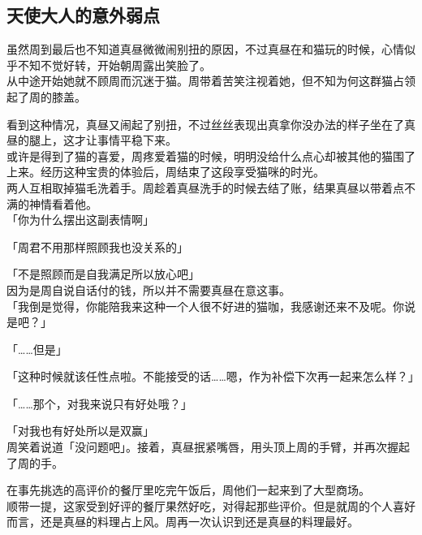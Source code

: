 \subsection{天使大人的意外弱点}

虽然周到最后也不知道真昼微微闹别扭的原因，不过真昼在和猫玩的时候，心情似乎不知不觉好转，开始朝周露出笑脸了。\\

从中途开始她就不顾周而沉迷于猫。周带着苦笑注视着她，但不知为何这群猫占领起了周的膝盖。

看到这种情况，真昼又闹起了别扭，不过丝丝表现出真拿你没办法的样子坐在了真昼的腿上，这才让事情平稳下来。\\

或许是得到了猫的喜爱，周疼爱着猫的时候，明明没给什么点心却被其他的猫围了上来。经历这种宝贵的体验后，周结束了这段享受猫咪的时光。\\

两人互相取掉猫毛洗着手。周趁着真昼洗手的时候去结了账，结果真昼以带着点不满的神情看着他。\\

「你为什么摆出这副表情啊」

「周君不用那样照顾我也没关系的」

「不是照顾而是自我满足所以放心吧」\\

因为是周自说自话付的钱，所以并不需要真昼在意这事。\\

「我倒是觉得，你能陪我来这种一个人很不好进的猫咖，我感谢还来不及呢。你说是吧？」

「……但是」

「这种时候就该任性点啦。不能接受的话……嗯，作为补偿下次再一起来怎么样？」

「……那个，对我来说只有好处哦？」

「对我也有好处所以是双赢」\\

周笑着说道「没问题吧」。接着，真昼抿紧嘴唇，用头顶上周的手臂，并再次握起了周的手。\\

\vspace{2\baselineskip}

在事先挑选的高评价的餐厅里吃完午饭后，周他们一起来到了大型商场。\\

顺带一提，这家受到好评的餐厅果然好吃，对得起那些评价。但是就周的个人喜好而言，还是真昼的料理占上风。周再一次认识到还是真昼的料理最好。\\


